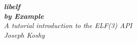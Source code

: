 \pagestyle{empty}
\raggedleft
\vspace*{\baselineskip}
{\Huge \itshape {\bfseries libelf} \\[0.2\baselineskip]
 \itshape \bfseries by Example}\\[2.2\baselineskip]
{\LARGE\itshape A tutorial introduction to the ELF(3) API}\\[0.45\textheight]
{\LARGE\itshape Joseph Koshy}\par
\vfill
